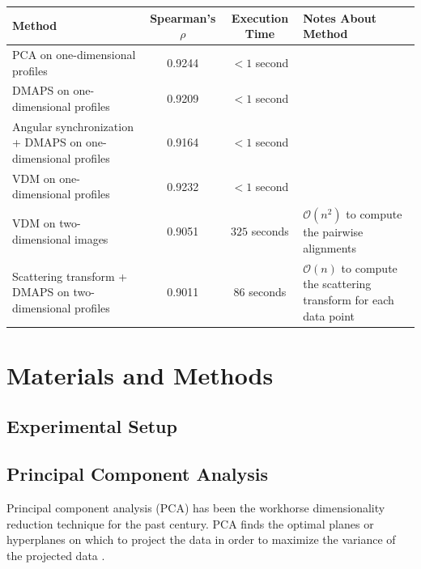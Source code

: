 \documentclass[10pt]{article}
\begin{document}
\begin{table}
	\begin{tabular}{| p{} | c | c | p{} |}
		\hline 
		Method & Spearman's $\rho$ & Execution Time & Notes About Method \\ 
		\hline 
		PCA on one-dimensional profiles & 0.9244 & $< 1$ second & \\
		\hline 
		DMAPS on one-dimensional profiles & 0.9209 & $< 1$ second & \\
		\hline 
		Angular synchronization + DMAPS on one-dimensional profiles & 0.9164 & $< 1$ second & \\
		\hline 
		VDM on one-dimensional profiles & 0.9232 & $< 1$ second & \\	
		\hline 
		VDM on two-dimensional images & 0.9051  & $325$ seconds & $\mathcal{O}(n^2)$ to compute the pairwise alignments\\
		\hline 	
		Scattering transform + DMAPS on two-dimensional profiles & 0.9011  & $86$ seconds &  $\mathcal{O}(n)$ to compute the scattering transform for each data point \\
		\hline
	\end{tabular}
\end{table}
\section*{Materials and Methods}

\subsection*{Experimental Setup}

\subsection*{Principal Component Analysis}
Principal component analysis (PCA) has been the workhorse dimensionality reduction technique for the past century.
%
PCA finds the optimal planes or hyperplanes on which to project the data in order to maximize the variance of the projected data \cite{shlens2005tutorial}.
\end{document}
